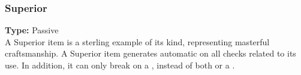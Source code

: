 \subsubsection{Superior}
\label{iqty:superior}
\textbf{Type:} Passive\\
A Superior item is a sterling example of its kind,
representing masterful craftsmanship. A Superior item
generates automatic \advantage on all checks related to
its use. In addition, it can only break on a \despair,
instead of both \threat\threat\threat or a \despair.
